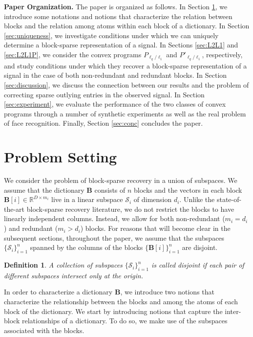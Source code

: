 \documentclass[10pt,twocolumn,twoside] {IEEEtran}
\newtheorem{definition}{Definition}
\begin{document}
{\medskip\noindent\textbf{{Paper Organization}.} } The paper is organized as follows. In Section \ref{sec:problemsetting}, we introduce some notations and notions that characterize the relation between blocks and the relation among atoms within each block of a dictionary. 
In Section \ref{sec:uniqueness}, we investigate conditions under which we can uniquely determine a block-sparse representation of a signal. In Sections \ref{sec:L2L1} and \ref{sec:L2L1P}, we consider the convex programs $P_{\ell_q/\ell_1}$ and $P'_{\ell_q/\ell_1}$, respectively, and study conditions under which they recover a block-sparse representation of a signal in the case of both non-redundant and redundant blocks. 
In Section \ref{sec:discussion}, we discuss the connection between our results and the problem of correcting sparse outlying entries in the observed signal. In Section \ref{sec:experiment}, we evaluate the performance of the two classes of convex programs through a number of synthetic experiments as well as the real problem of face recognition. Finally, Section \ref{sec:conc} concludes the paper.

\section{Problem Setting}
\label{sec:problemsetting}
We consider the problem of block-sparse recovery in a union of subspaces. We assume that the dictionary ${\boldsymbol{B}}$ consists of $n$ blocks and the vectors in each block ${\boldsymbol{B}}[i] \in {\mathbb{R}}^{D \times m_i}$ live in a linear subspace $\mathcal{S}_i$ of dimension $d_i$. Unlike the state-of-the-art block-sparse recovery literature, we do not restrict the blocks to have linearly independent columns. Instead, we allow for both non-redundant ($m_i = d_i$) and redundant ($m_i > d_i$) blocks. 
For reasons that will become clear in the subsequent sections, throughout the paper, we assume that the subspaces $\{\mathcal{S}_i\}_{i=1}^n$ spanned by the columns of the blocks $\{ {\boldsymbol{B}}[i] \}_{i=1}^n$ are disjoint.
\vspace{1mm}
\begin{definition}
\label{def:disjoint}
A collection of subspaces $\{\mathcal{S}_i\}_{i=1}^n$ is called \emph{disjoint} if each pair of different subspaces intersect only at the origin.
\end{definition}
\vspace{1mm}

In order to characterize a dictionary ${\boldsymbol{B}}$, we introduce two notions that characterize the relationship between the blocks and among the atoms of each block of the dictionary. We start by introducing notions that capture the inter-block relationships of a dictionary. To do so, we make use of the subspaces associated with the blocks. 
\end{document}
